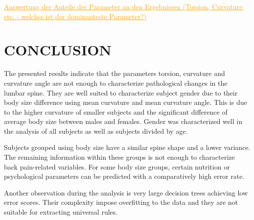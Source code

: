 \documentclass[a4paper,twoside]{style/article}
\newcommand{\com}[1]{\textcolor{orange}{\uline{#1}}}
\begin{document}


\com{Auswertung der Anteile der Parameter an den Ergebnissen (Torsion, Curvature, etc. - welches ist der dominanteste Parameter?)}

\section{\uppercase{Conclusion}}
\label{sec:Conclusion}
\noindent The presented results indicate that the parameters torsion, curvature and curvature angle are not enough to characterize pathological changes in the lumbar spine.
They are well suited to characterize subject gender due to their body size difference using mean curvature and mean curvature angle.
This is due to the higher curvature of smaller subjects and the significant difference of average body size between males and females.
Gender was characterized well in the analysis of all subjects as well as subjects divided by age.

Subjects grouped using body size have a similar spine shape and a lower variance.
The remaining information within these groups is not enough to characterize back pain-related variables.
For some body size groups, certain nutrition or psychological parameters can be predicted with a comparatively high error rate.

Another observation during the analysis is very large decision trees achieving low error scores.
Their complexity impose overfitting to the data and they are not suitable for extracting universal rules.
\end{document}

